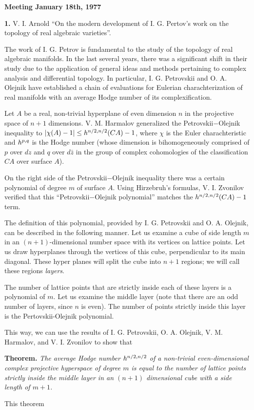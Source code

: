 \documentclass{article}
\begin{document}
\noindent\textbf{Meeting January 18th, 1977}

\textbf{1.} V. I. Arnold ``On the modern development of I. G. Pertov's work on
the topology of real algebraic varieties''.

The work of I. G. Petrov is fundamental to the study of the topology of real
algebraic manifolds.
In the last several years, there was a significant shift in their study due to
the application of general ideas and methods pertaining to complex analysis and
differential topology.
In particular, I. G. Petrovskii and O. A. Olejnik have established a chain of
evaluations for Eulerian charachterization of real manifolds with an average
Hodge number of its complexification.

Let $A$ be a real, non-trivial hyperplane of even dimension $n$ in the
projective space of $n+1$ dimensions.
V. M. Harmalov generalized the Petrovskii$-$Olejnik inequality to
$|\chi(A)-1|\leq h\smash{^{n/2,n/2}}(CA)-1$, where $\chi$ is the Euler charachteristic
and $h\smash{^{p,q}}$ is the Hodge number (whose dimension is bihomogeneously
comprised of $p$ over $dz$ and $q$ over $d\bar z$ in the group of complex
cohomologies of the classification $CA$ over surface $A$).

On the right side of the Petrovskii$-$Olejnik inequality there was a certain
polynomial of degree $m$ of surface $A$.
Using Hirzebruh's formulas, V. I. Zvonilov verified that this
``Petrovskii$-$Olejnik polynomial'' matches the $h\smash{^{n/2,n/2}}(CA)-1$
term.

The definition of this polynomial, provided by I. G. Petrovskii and O. A.
Olejnik, can be described in the following manner.
Let us examine a cube of side length $m$ in an $(n+1)$-dimensional number space
with its vertices on lattice points.
Let us draw hyperplanes through the vertices of this cube, perpendicular to its
main diagonal.
These hyper planes will split the cube into $n+1$ regions; we will call these
regions \textit{layers}.

The number of lattice points that are strictly inside each of these layers is a
polynomial of $m$.
Let us examine the middle layer (note that there are an odd number of layers,
since $n$ is even).
The number of points strictly inside this layer is the Pertovskii-Olejnik polynomial.

This way, we can use the results of I. G. Petrovskii, O. A. Olejnik, V. M.
Harmalov, and V. I. Zvonilov to show that

\textbf{Theorem. }\textit{The average Hodge number $h\smash{^{n/2,n/2}}$ of a
non-trivial even-dimensional complex projective hyperspace of degree $m$ is
equal to the number of lattice points strictly inside the middle layer in an
$(n+1)$ dimensional cube with a side length of $m+1$.}

This theorem
\end{document}
